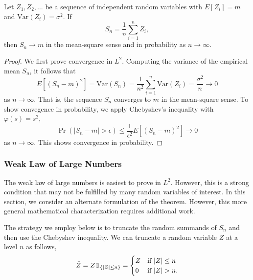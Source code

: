 \begin{theorem}
Let $Z_1, Z_2, \ldots$ be a sequence of independent random variables with $E [Z_i] = m$ and $\mathrm{Var}(Z_i) = \sigma^2$.
If
\begin{equation*}
S_n = \frac{1}{n} \sum_{i=1}^n Z_i ,
\end{equation*}
then $S_n \rightarrow m$ in the mean-square sense and in probability as $n \rightarrow \infty$.
\end{theorem}
\begin{proof}
We first prove convergence in $L^2$.
Computing the variance of the empirical mean $S_n$, it follows that
\begin{equation*}
E \left[ ( S_n - m )^2 \right]
= \mathrm{Var} ( S_n )
= \frac{1}{n^2} \sum_{i=1}^n \mathrm{Var} (Z_i)
= \frac{\sigma^2}{n} \rightarrow 0
\end{equation*}
as $n \rightarrow \infty$.
That is, the sequence $S_n$ converges to $m$ in the mean-square sense.
To show convegence in probability, we apply Chebyshev's inequality with $\varphi (s) = s^2$,
\begin{equation*}
\Pr ( | S_n - m | > \epsilon )
\leq \frac{1}{\epsilon^2} E \left[ ( S_n - m )^2 \right]
\rightarrow 0
\end{equation*}
as $n \rightarrow \infty$.
This shows convergence in probability.
\end{proof}

\subsubsection{Weak Law of Large Numbers}

The weak law of large numbers is easiest to prove in $L^2$.
However, this is a strong condition that may not be fulfilled by many random variables of interest.
In this section, we consider an alternate formulation of the theorem.
However, this more general mathematical characterization requires additional work.

The strategy we employ below is to truncate the random summands of $S_n$ and then use the Chebyshev inequality.
We can truncate a random variable $Z$ at a level $n$ as follows,
\begin{equation*}
\bar{Z} = Z \mathrm{1\!\!1}_{\{ |Z| \leq n \}}
= \begin{cases} Z & \text{if } |Z| \leq n \\
0 & \text{if } |Z| > n . \end {cases}
\end{equation*}

